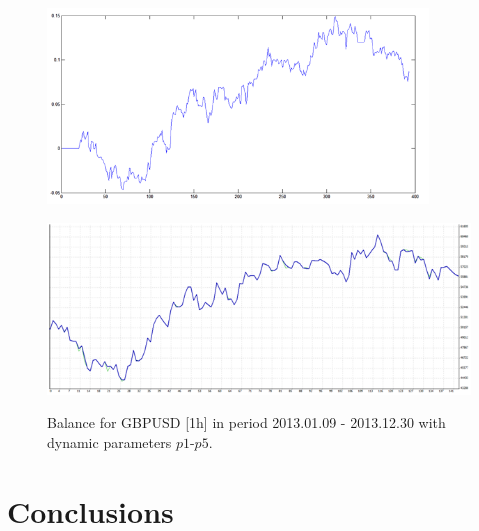 \documentclass[runningheads,a4paper]{llncs}
\begin{document}
\begin{figure}[h!]
\begin{minipage}{0.49\textwidth}
\centering
\includegraphics[width = 0.9\textwidth]{figures/rys14.png}
\label{fig:fig14}
\end{minipage}
\begin{minipage}{0.49\textwidth}
\centering
\includegraphics[width = \textwidth]{figures/rys15.png}
\label{fig:fig15}
\end{minipage}
\caption{Balance for GBPUSD [1h] in period 2013.01.09 - 2013.12.30 with dynamic parameters $p1$-$p5$.}
\end{figure}
\FloatBarrier

\section{Conclusions}
\end{document}
